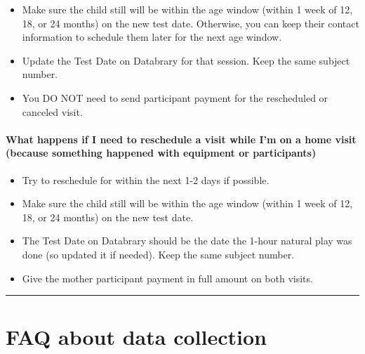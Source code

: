 \documentclass[
  12pt,
]{book}
\providecommand{\tightlist}{%
  \setlength{\itemsep}{0pt}\setlength{\parskip}{0pt}}
\begin{document}
\begin{itemize}
\tightlist
\item
  Make sure the child still will be within the age window (within 1 week of 12, 18, or 24 months) on the new test date. Otherwise, you can keep their contact information to schedule them later for the next age window.
\item
  Update the Test Date on Databrary for that session. Keep the same subject number.
\item
  You DO NOT need to send participant payment for the rescheduled or canceled visit.
\end{itemize}

\hypertarget{what-happens-if-i-need-to-reschedule-a-visit-while-im-on-a-home-visit-because-something-happened-with-equipment-or-participants}{%
\paragraph*{What happens if I need to reschedule a visit while I'm on a home visit (because something happened with equipment or participants)}\label{what-happens-if-i-need-to-reschedule-a-visit-while-im-on-a-home-visit-because-something-happened-with-equipment-or-participants}}

\begin{itemize}
\tightlist
\item
  Try to reschedule for within the next 1-2 days if possible.
\item
  Make sure the child still will be within the age window (within 1 week of 12, 18, or 24 months) on the new test date.
\item
  The Test Date on Databrary should be the date the 1-hour natural play was done (so updated it if needed). Keep the same subject number.
\item
  Give the mother participant payment in full amount on both visits.
\end{itemize}

\begin{center}\rule{0.5\linewidth}{0.5pt}\end{center}

\hypertarget{faqs_collection}{%
\section{FAQ about data collection}\label{faqs_collection}}
\end{document}
